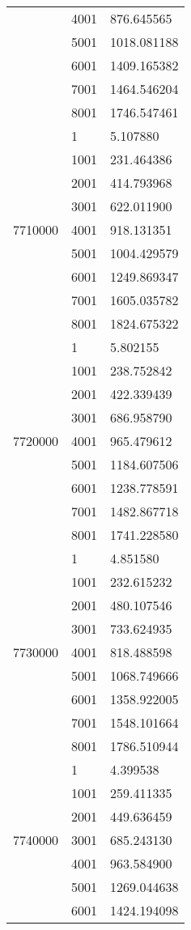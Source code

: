 \begin{table}[htb!]
\begin{tabular}{lll}
 & 4001 & 876.645565 \\
 & 5001 & 1018.081188 \\
 & 6001 & 1409.165382 \\
 & 7001 & 1464.546204 \\
 & 8001 & 1746.547461 \\
\multirow[c]{9}{*}{7710000} & 1 & 5.107880 \\
 & 1001 & 231.464386 \\
 & 2001 & 414.793968 \\
 & 3001 & 622.011900 \\
 & 4001 & 918.131351 \\
 & 5001 & 1004.429579 \\
 & 6001 & 1249.869347 \\
 & 7001 & 1605.035782 \\
 & 8001 & 1824.675322 \\
\multirow[c]{9}{*}{7720000} & 1 & 5.802155 \\
 & 1001 & 238.752842 \\
 & 2001 & 422.339439 \\
 & 3001 & 686.958790 \\
 & 4001 & 965.479612 \\
 & 5001 & 1184.607506 \\
 & 6001 & 1238.778591 \\
 & 7001 & 1482.867718 \\
 & 8001 & 1741.228580 \\
\multirow[c]{9}{*}{7730000} & 1 & 4.851580 \\
 & 1001 & 232.615232 \\
 & 2001 & 480.107546 \\
 & 3001 & 733.624935 \\
 & 4001 & 818.488598 \\
 & 5001 & 1068.749666 \\
 & 6001 & 1358.922005 \\
 & 7001 & 1548.101664 \\
 & 8001 & 1786.510944 \\
\multirow[c]{9}{*}{7740000} & 1 & 4.399538 \\
 & 1001 & 259.411335 \\
 & 2001 & 449.636459 \\
 & 3001 & 685.243130 \\
 & 4001 & 963.584900 \\
 & 5001 & 1269.044638 \\
 & 6001 & 1424.194098 \\

\end{tabular}
\end{table}
